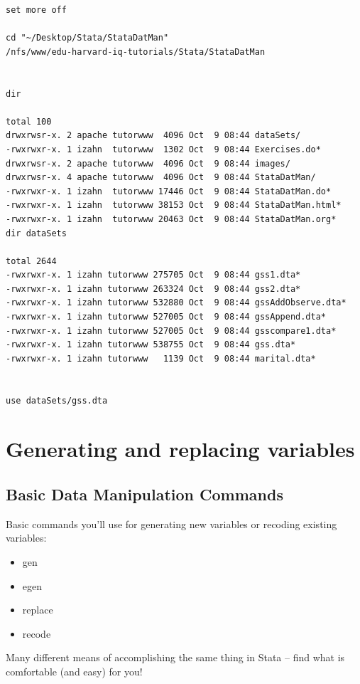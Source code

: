 \documentclass[]{book}
\providecommand{\tightlist}{%
  \setlength{\itemsep}{0pt}\setlength{\parskip}{0pt}}
\begin{document}
\begin{verbatim}
set more off

cd "~/Desktop/Stata/StataDatMan"
/nfs/www/edu-harvard-iq-tutorials/Stata/StataDatMan


dir

total 100
drwxrwsr-x. 2 apache tutorwww  4096 Oct  9 08:44 dataSets/
-rwxrwxr-x. 1 izahn  tutorwww  1302 Oct  9 08:44 Exercises.do*
drwxrwsr-x. 2 apache tutorwww  4096 Oct  9 08:44 images/
drwxrwsr-x. 4 apache tutorwww  4096 Oct  9 08:44 StataDatMan/
-rwxrwxr-x. 1 izahn  tutorwww 17446 Oct  9 08:44 StataDatMan.do*
-rwxrwxr-x. 1 izahn  tutorwww 38153 Oct  9 08:44 StataDatMan.html*
-rwxrwxr-x. 1 izahn  tutorwww 20463 Oct  9 08:44 StataDatMan.org*
dir dataSets

total 2644
-rwxrwxr-x. 1 izahn tutorwww 275705 Oct  9 08:44 gss1.dta*
-rwxrwxr-x. 1 izahn tutorwww 263324 Oct  9 08:44 gss2.dta*
-rwxrwxr-x. 1 izahn tutorwww 532880 Oct  9 08:44 gssAddObserve.dta*
-rwxrwxr-x. 1 izahn tutorwww 527005 Oct  9 08:44 gssAppend.dta*
-rwxrwxr-x. 1 izahn tutorwww 527005 Oct  9 08:44 gsscompare1.dta*
-rwxrwxr-x. 1 izahn tutorwww 538755 Oct  9 08:44 gss.dta*
-rwxrwxr-x. 1 izahn tutorwww   1139 Oct  9 08:44 marital.dta*


use dataSets/gss.dta
\end{verbatim}

\section{Generating and replacing
variables}\label{generating-and-replacing-variables-1}

\subsection{Basic Data Manipulation
Commands}\label{basic-data-manipulation-commands}

Basic commands you'll use for generating new variables or recoding
existing variables:

\begin{itemize}
\tightlist
\item
  gen
\item
  egen
\item
  replace
\item
  recode
\end{itemize}

Many different means of accomplishing the same thing in Stata -- find
what is comfortable (and easy) for you!
\end{document}
